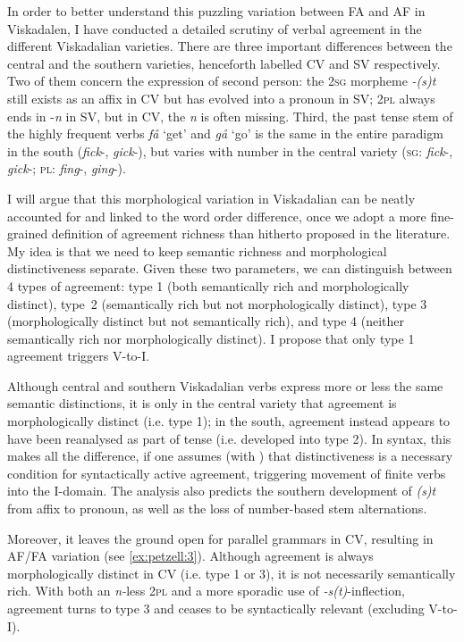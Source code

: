 \documentclass[output=paper,colorlinks,citecolor=brown,draft,draftmode]{langscibook}
\begin{document}
In order to better understand this puzzling variation between FA and AF in Viskadalen, I have conducted a detailed scrutiny of verbal agreement in the different Viskadalian varieties. There are three important differences between the central and the southern varieties, henceforth labelled CV and SV respectively. Two of them concern the expression of second person: the 2\textsc{sg} morpheme \textit{-(s)t} still exists as an affix in CV but has evolved into a pronoun in SV; 2\textsc{pl} always ends in -\textit{n} in SV, but in CV, the \textit{n} is often missing. Third, the past tense stem of the highly frequent verbs \textit{få} ‘get’ and \textit{gå} ‘go’ is the same in the entire paradigm in the south (\textit{fick}-, \textit{gick}-), but varies with number in the central variety (\textsc{sg}: \textit{fick}-, \textit{gick}-; \textsc{pl}: \textit{fing}-, \textit{ging}-).



I will argue that this morphological variation in Viskadalian can be neatly accounted for and linked to the word order difference, once we adopt a more fine-grained definition of agreement richness than hitherto proposed in the literature. My idea is that we need to keep semantic richness and morphological distinctiveness separate. Given these two parameters, we can distinguish between 4 types of agreement: type 1 (both semantically rich and morphologically distinct), type~2 (semantically rich but not morphologically distinct), type 3 (morphologically distinct but not semantically rich), and type 4 (neither semantically rich nor morphologically distinct). I propose that only type 1 agreement triggers V-to-I.



Although central and southern Viskadalian verbs express more or less the same semantic distinctions, it is only in the central variety that agreement is morphologically distinct (i.e. type 1); in the south, agreement instead appears to have been reanalysed as part of tense (i.e. developed into type 2). In syntax, this makes all the difference, if one assumes (with \citealt{BobaljikThrainsson1998}) that distinctiveness is a necessary condition for syntactically active agreement, triggering movement of finite verbs into the I-domain. The analysis also predicts the southern development of \textit{(s)t} from affix to pronoun, as well as the loss of number-based stem alternations. 



Moreover, it leaves the ground open for parallel grammars in CV, resulting in AF/FA variation (see \ref{ex:petzell:3}). Although agreement is always morphologically distinct in CV (i.e. type 1 or 3), it is not necessarily semantically rich. With both an \textit{n-}less 2\textsc{pl} and a more sporadic use of \textit{-s(t)}-inflection, agreement turns to type 3 and ceases to be syntactically relevant (excluding V-to-I).
\end{document}
